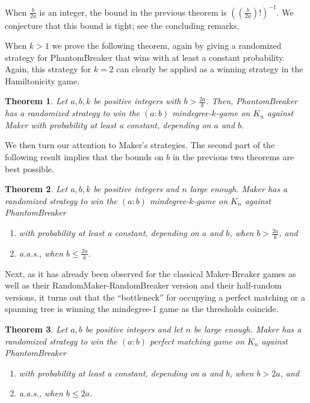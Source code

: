 \documentclass[11pt, a4paper]{article}
\numberwithin{equation}{section}
\numberwithin{figure}{section}
\newtheorem{theorem}{Theorem}
\begin{document}
When $\frac{b}{2a}$ is an integer, the bound in the previous theorem is $\left( (\frac{b}{2a})!\right)^{-1}$. We conjecture that this bound is tight; see the concluding remarks.

When $k>1$ we prove the following theorem, again by giving a randomized strategy for PhantomBreaker that wins with at least a constant probability. Again, this strategy for $k=2$ can clearly be applied as a winning strategy in the Hamiltonicity game.

\begin{theorem}\label{thm:breaker_degreek}
Let $a,b,k$ be positive integers with $b>\frac{2a}{k}$.
Then, PhantomBreaker has a randomized strategy 
to win the 
$(a:b)$ mindegree-$k$-game on $K_n$ against Maker
with probability at least
a constant, depending on $a$ and $b$.
\end{theorem}

We then turn our attention to Maker's strategies. The second part of the following result implies that the bounds on $b$ in the previous two theorems are best possible.

\begin{theorem} \label{thm:maker_degree}
Let $a,b,k$ be positive integers and $n$ large enough. Maker has a randomized strategy to win the $(a:b)$ mindegree-$k$-game on $K_n$ against PhantomBreaker
\begin{enumerate}[label=(\alph*)]
    \item \label{m_deg_large_b} with probability at least a constant, depending on $a$ and $b$, when $b > \frac{2a}{k}$, and
    \item \label{m_deg_small_b} a.a.s., when $b\leq \frac{2a}{k}$.
\end{enumerate}
\end{theorem}

Next, as it has already been observed for the classical Maker-Breaker games as well as their RandomMaker-RandomBreaker version and their half-random versions, it turns out that the ``bottleneck'' for occupying a perfect matching or a spanning tree is winning the mindegree-1 game as the thresholds coincide.



\begin{theorem}\label{thm:maker_matching}
Let $a,b$ be positive integers and let $n$ be large enough. Maker has a randomized strategy to win the $(a:b)$  perfect matching game on $K_n$ against PhantomBreaker
\begin{enumerate}[label=(\alph*)]
    \item \label{match_large_b} with probability at least
a constant, depending on $a$ and $b$, when $b > 2a$, and
    \item \label{match_small_b} a.a.s., when $b\leq 2a$.
\end{enumerate}

\end{theorem}
\end{document}

